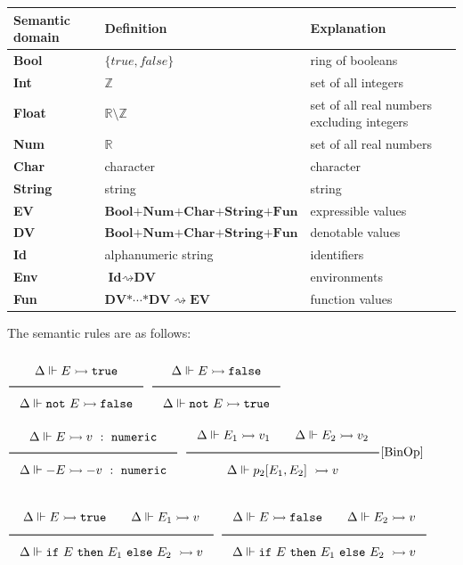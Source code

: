 \documentclass[a4paper]{article}
\newcommand{\Rule}[2]{\genfrac{}{}{0.7pt}{}{{\setlength{\fboxrule}{0pt}\setlength{\fboxsep}{3mm}\fbox{$#1$}}}{{\setlength{\fboxrule}{0pt}\setlength{\fboxsep}{3mm}\fbox{$#2$}}}}
\newcommand{\RuleWithName}[3]{\genfrac{}{}{0.7pt}{}{{\setlength{\fboxrule}{0pt}\setlength{\fboxsep}{3mm}\fbox{$#1$}}}{{\setlength{\fboxrule}{0pt}\setlength{\fboxsep}{3mm}\fbox{$#2$}}}[\text{#3}]}
\newcommand{\TruE}{\texttt{true}}
\newcommand{\FalsE}{\texttt{false}}
\newcommand{\Num}{\texttt{numeric}}
\newcommand{\eval}{\rightarrowtail}
\newcommand{\partfun}{\rightsquigarrow}
\newcommand{\under}{\Vdash}
\begin{document}
\vspace{3mm}
\begin{center}
\begin{tabular}{|l|ll|} \hline
Semantic domain & Definition & Explanation\\ \hline
\textbf{Bool} & $\{\textit{true}, \textit{false}\}$ & ring of booleans  \\
\textbf{Int}  & $\mathbb{Z}$     & set of all integers \\
\textbf{Float}  & $\mathbb{R} \setminus \mathbb{Z}$     & set of all real numbers excluding integers \\
\textbf{Num}  & $\mathbb{R}$     & set of all real numbers \\
\textbf{Char}  & character     & character \\
\textbf{String}  & string     & string \\
\textbf{EV}   & $\textbf{Bool} \boldsymbol{+} \textbf{Num} \boldsymbol{+} \textbf{Char} \boldsymbol{+} \textbf{String} \boldsymbol{+} \textbf{Fun} $     & expressible values \\
\textbf{DV}   & $\textbf{Bool} \boldsymbol{+} \textbf{Num} \boldsymbol{+} \textbf{Char} \boldsymbol{+} \textbf{String} \boldsymbol{+} \textbf{Fun} $     & denotable values \\
\textbf{Id}   & alphanumeric string     & identifiers \\
\textbf{Env}   & $\textbf{Id} \partfun \textbf{DV}$ & environments \\
\textbf{Fun}   & $\textbf{DV} \boldsymbol{*} \cdots \boldsymbol{*} \textbf{DV} \partfun \textbf{EV}$ & function values \\ \hline
\end{tabular}
\end{center}

The semantic rules are as follows:

$\Rule{\Delta \under E \eval \TruE}{\Delta \under \texttt{not}\ E \eval \FalsE}$
\hfill
$\Rule{\Delta \under E \eval \FalsE}{\Delta \under \texttt{not}\ E \eval \TruE}$
\hfill
$\Rule{\Delta \under E \eval v\ :\ \Num}{\Delta \under -E \eval -v\ :\ \Num}$
\hfill
$\RuleWithName{\Delta \under E_1 \eval v_1 \qquad \Delta \under E_2 \eval v_2}{\Delta \under p_2[E_1, E_2]\ \eval v}{BinOp}$

$\Rule{\Delta \under E \eval \TruE \qquad \Delta \under E_1 \eval v}{\Delta \under \texttt{if}\ E\ \texttt{then}\ E_1\ \texttt{else}\ E_2\ \eval v}$
\hfill
$\Rule{\Delta \under E \eval \FalsE \qquad \Delta \under E_2 \eval v}{\Delta \under \texttt{if}\ E\ \texttt{then}\ E_1\ \texttt{else}\ E_2\ \eval v}$
\end{document}
